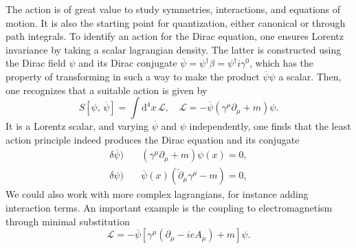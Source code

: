 The action is of great value to study symmetries, interactions, and equations of motion. It is also the starting point for quantization, either canonical or through path integrals. To identify an action for the Dirac equation, one ensures Lorentz invariance by taking a scalar lagrangian density. The latter is constructed using the Dirac field \(\psi\) and its Dirac conjugate \(\overline{\psi} = \psi^{\dagger} \beta = \psi^{\dagger} i \gamma^0\), which has the property of transforming in such a way to make the product \(\overline{\psi} \psi\) a scalar. Then, one recognizes that a suitable action is given by
\begin{equation}
    S[\psi,\,\overline{\psi}] = \int \mathrm{d}^4 x\,\mathcal{L}, \quad \mathcal{L} = -\overline{\psi}(\gamma^{\mu} \partial_\mu + m)\psi.
    \label{eq:dirac_action_lagrangian}
\end{equation}
It is a Lorentz scalar, and varying \(\overline{\psi}\) and \(\psi\) independently, one finds that the least action principle indeed produces the Dirac equation and its conjugate
\[
    \begin{aligned}
        \delta \overline{\psi}) & \quad (\gamma^{\mu} \partial_\mu + m)\psi(x) = 0,                             \\
        \delta \psi)            & \quad \overline{\psi}(x) (\overleftarrow{\partial}_\mu \gamma^{\mu} - m) = 0,
    \end{aligned}
\]
We could also work with more complex lagrangians, for instance adding interaction terms. An important example is the coupling to electromagnetism through minimal substitution
\[
    \mathcal{L} = - \overline{\psi} \left[\gamma^{\mu} (\partial_\mu - i e A_\mu) + m \right] \psi.
\]

